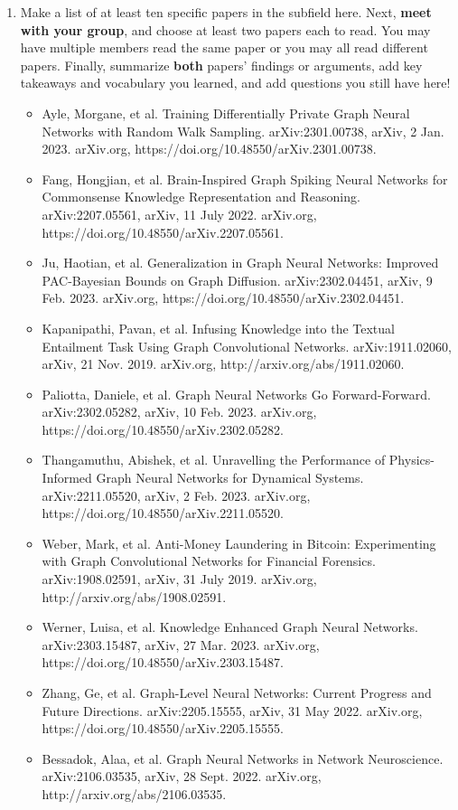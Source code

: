 \documentclass[letterpaper,11pt]{article}
\begin{document}
\begin{enumerate}
\item 
Make a list of at least ten specific papers in the subfield here. Next, \textbf{meet with your group}, and choose at least two papers each to read. You may have multiple members read the same paper or you may all read different papers. Finally, summarize \textbf{both} papers' findings or arguments, add key takeaways and vocabulary you learned, and add questions you still have here!
\begin{tcolorbox}
  \begin{itemize}
    \item Ayle, Morgane, et al. Training Differentially Private Graph Neural Networks with Random Walk Sampling. arXiv:2301.00738, arXiv, 2 Jan. 2023. arXiv.org, https://doi.org/10.48550/arXiv.2301.00738.
    \item Fang, Hongjian, et al. Brain-Inspired Graph Spiking Neural Networks for Commonsense Knowledge Representation and Reasoning. arXiv:2207.05561, arXiv, 11 July 2022. arXiv.org, https://doi.org/10.48550/arXiv.2207.05561.
    \item Ju, Haotian, et al. Generalization in Graph Neural Networks: Improved PAC-Bayesian Bounds on Graph Diffusion. arXiv:2302.04451, arXiv, 9 Feb. 2023. arXiv.org, https://doi.org/10.48550/arXiv.2302.04451.
    \item Kapanipathi, Pavan, et al. Infusing Knowledge into the Textual Entailment Task Using Graph Convolutional Networks. arXiv:1911.02060, arXiv, 21 Nov. 2019. arXiv.org, http://arxiv.org/abs/1911.02060.
    \item Paliotta, Daniele, et al. Graph Neural Networks Go Forward-Forward. arXiv:2302.05282, arXiv, 10 Feb. 2023. arXiv.org, https://doi.org/10.48550/arXiv.2302.05282.
    \item Thangamuthu, Abishek, et al. Unravelling the Performance of Physics-Informed Graph Neural Networks for Dynamical Systems. arXiv:2211.05520, arXiv, 2 Feb. 2023. arXiv.org, https://doi.org/10.48550/arXiv.2211.05520.
    \item Weber, Mark, et al. Anti-Money Laundering in Bitcoin: Experimenting with Graph Convolutional Networks for Financial Forensics. arXiv:1908.02591, arXiv, 31 July 2019. arXiv.org, http://arxiv.org/abs/1908.02591.
    \item Werner, Luisa, et al. Knowledge Enhanced Graph Neural Networks. arXiv:2303.15487, arXiv, 27 Mar. 2023. arXiv.org, https://doi.org/10.48550/arXiv.2303.15487.
    \item Zhang, Ge, et al. Graph-Level Neural Networks: Current Progress and Future Directions. arXiv:2205.15555, arXiv, 31 May 2022. arXiv.org, https://doi.org/10.48550/arXiv.2205.15555.
    \item Bessadok, Alaa, et al. Graph Neural Networks in Network Neuroscience. arXiv:2106.03535, arXiv, 28 Sept. 2022. arXiv.org, http://arxiv.org/abs/2106.03535.
  \end{itemize}
\end{tcolorbox}

\end{enumerate}
\end{document}
